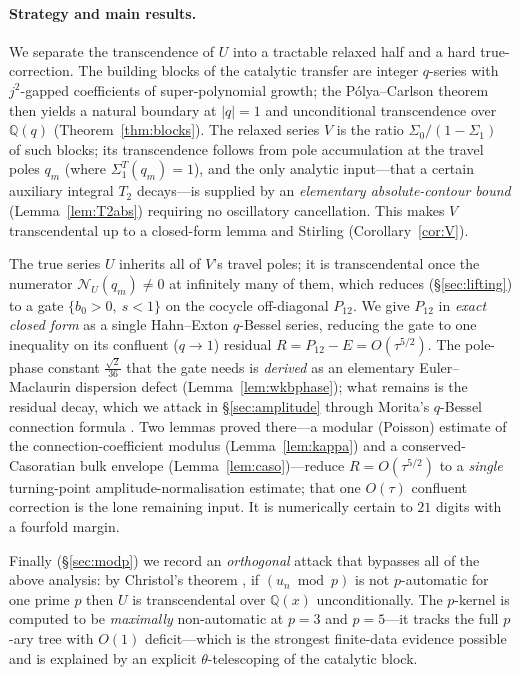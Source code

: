 \documentclass[11pt]{article}
\begin{document}
\paragraph{Strategy and main results.} We separate the transcendence of $U$ into a tractable
relaxed half and a hard true-correction. The building blocks of the catalytic transfer are
integer $q$-series with $j^2$-gapped coefficients of super-polynomial growth; the
P\'olya--Carlson theorem then yields a natural boundary at $|q|=1$ and unconditional
transcendence over $\mathbb Q(q)$ (Theorem~\ref{thm:blocks}). The relaxed series $V$ is the
ratio $\Sigma_0/(1-\Sigma_1)$ of such blocks; its transcendence follows from pole accumulation
at the travel poles $q_m$ (where $\Sigma_1^T(q_m)=1$), and the only analytic input---that a
certain auxiliary integral $T_2$ decays---is supplied by an \emph{elementary absolute-contour
bound} (Lemma~\ref{lem:T2abs}) requiring no oscillatory cancellation. This makes $V$
transcendental up to a closed-form lemma and Stirling (Corollary~\ref{cor:V}).

The true series $U$ inherits all of $V$'s travel poles; it is transcendental once the numerator
$\mathcal N_U(q_m)\ne0$ at infinitely many of them, which reduces (\S\ref{sec:lifting}) to a gate
$\{b_0>0,\ s<1\}$ on the cocycle off-diagonal $P_{12}$. We give $P_{12}$ in \emph{exact closed
form} as a single Hahn--Exton $q$-Bessel series, reducing the gate to one inequality on its
confluent ($q\to1$) residual $R=P_{12}-E=O(\tau^{5/2})$. The pole-phase constant
$\tfrac{\sqrt2}{36}$ that the gate needs is \emph{derived} as an elementary Euler--Maclaurin
dispersion defect (Lemma~\ref{lem:wkbphase}); what remains is the residual decay, which we
attack in \S\ref{sec:amplitude} through Morita's $q$-Bessel connection formula
\cite{Morita2011}. Two lemmas proved there---a modular (Poisson) estimate of the
connection-coefficient modulus (Lemma~\ref{lem:kappa}) and a conserved-Casoratian bulk envelope
(Lemma~\ref{lem:caso})---reduce $R=O(\tau^{5/2})$ to a \emph{single} turning-point
amplitude-normalisation estimate; that one $O(\tau)$ confluent correction is the lone
remaining input. It is numerically certain to $21$ digits with a fourfold margin.

Finally (\S\ref{sec:modp}) we record an \emph{orthogonal} attack that bypasses all of the above
analysis: by Christol's theorem \cite{OldeDaalhuis1994}, if $(u_n\bmod p)$ is not $p$-automatic
for one prime $p$ then $U$ is transcendental over $\mathbb Q(x)$ unconditionally. The $p$-kernel
is computed to be \emph{maximally} non-automatic at $p=3$ and $p=5$---it tracks the full $p$-ary
tree with $O(1)$ deficit---which is the strongest finite-data evidence possible and is explained
by an explicit $\theta$-telescoping of the catalytic block.
\end{document}

